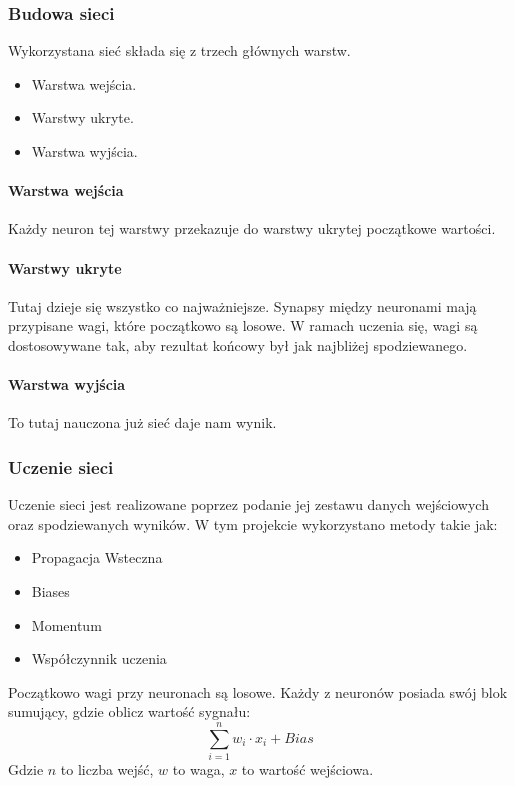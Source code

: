 \documentclass[12pt,a4paper]{article}
\begin{document}
\subsubsection{Budowa sieci}
Wykorzystana sieć składa się z trzech głównych warstw.
\begin{itemize}
	\item Warstwa wejścia.
	\item Warstwy ukryte.
	\item Warstwa wyjścia.
\end{itemize}
\paragraph*{Warstwa wejścia} Każdy neuron tej warstwy przekazuje do warstwy ukrytej początkowe wartości.
\paragraph*{Warstwy ukryte} Tutaj dzieje się wszystko co najważniejsze. Synapsy między neuronami mają przypisane wagi, które początkowo są losowe. W ramach uczenia się, wagi są dostosowywane tak, aby rezultat końcowy był jak najbliżej spodziewanego.
\paragraph*{Warstwa wyjścia} To tutaj nauczona już sieć daje nam wynik.
\subsubsection{Uczenie sieci}
Uczenie sieci jest realizowane poprzez podanie jej zestawu danych wejściowych oraz spodziewanych wyników. W tym projekcie wykorzystano metody takie jak:
\begin{itemize}
\item Propagacja Wsteczna
\item Biases
\item Momentum
\item Współczynnik uczenia
\end{itemize}

Początkowo wagi przy neuronach są losowe. Każdy z neuronów posiada swój blok sumujący, gdzie oblicz wartość sygnału:
$$ \sum_{i=1}^{n}{w_i\cdot x_i + Bias} $$
Gdzie $n$ to liczba wejść, $w$ to waga, $x$ to wartość wejściowa.
\end{document}
